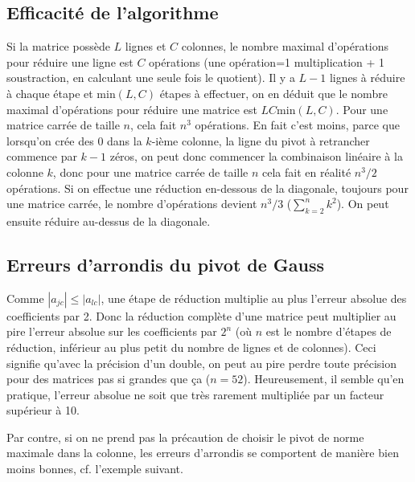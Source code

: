 \documentclass[a4paper,11pt]{book}
\begin{document}
\begin{giacjshere}
\subsection{Efficacité de l'algorithme}
Si la matrice possède $L$ lignes et $C$ colonnes,
le nombre maximal d'opérations pour réduire une ligne est 
$C$ op\'erations (une op\'eration=1 multiplication + 1 soustraction, 
en calculant une seule fois le quotient). 
Il y a $L-1$ lignes à réduire à chaque
étape et min$(L,C)$ étapes à effectuer, on en déduit que le
nombre maximal d'opérations pour réduire une matrice est
$LC$min$(L,C)$. Pour une matrice carrée de taille $n$, cela fait 
$n^3$ opérations. En fait c'est moins, parce que lorsqu'on cr\'ee
des 0 dans la $k$-i\`eme colonne, la ligne du pivot \`a retrancher
commence par $k-1$ z\'eros, on peut donc commencer la combinaison lin\'eaire 
\`a la colonne $k$, donc pour une matrice carr\'ee de taille $n$ cela
fait en r\'ealit\'e $n^3/2$ op\'erations.
Si on effectue une r\'eduction en-dessous de la diagonale, 
toujours pour une matrice carr\'ee, le nombre d'op\'erations 
devient $n^3/3$ ($\sum_{k=2}^n k^2$). On peut ensuite r\'eduire au-dessus
de la diagonale.

\subsection{Erreurs d'arrondis du pivot de Gauss} 
Comme $|a_{jc}| \leq |a_{lc}|$, une étape de réduction multiplie
au plus l'erreur absolue des coefficients par 2. Donc la
réduction complète d'une matrice peut multiplier au pire l'erreur
absolue sur les coefficients par $2^n$ (où $n$ est le nombre
d'étapes de réduction, inférieur au plus petit du nombre de lignes
et de colonnes). Ceci signifie qu'avec la précision d'un double,
on peut au pire perdre toute précision pour des matrices pas
si grandes que ça ($n=52$). Heureusement, il semble qu'en pratique, 
l'erreur absolue
ne soit que très rarement multipliée par un facteur supérieur à 10.

Par contre, si on ne prend pas la précaution de choisir le pivot
de norme maximale dans la colonne, les erreurs d'arrondis se
comportent de manière bien moins bonnes, cf. l'exemple suivant.


\end{giacjshere}
\end{document}

